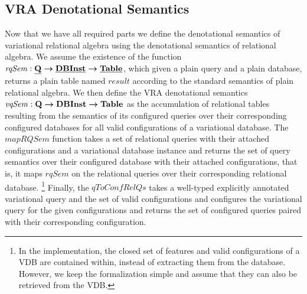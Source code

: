 \subsection{VRA Denotational Semantics }
\label{sec:vradensem}


Now that we have all required parts we define the denotational semantics of 
variational relational algebra using the denotational semantics of relational 
algebra. 
We assume the existence of the function
$\mathit{rqSem} : \pQSet \totype \pInstSet \totype \pTabSet$, which given a plain query and
a plain database, returns a plain table named $\mathit{result}$
according to the standard semantics of plain relational algebra.
%
We then define the VRA denotational semantics 
$\mathit{vqSem} : \qSet \totype \vdbInstSet \totype \tabletype$ as the 
accumulation of relational tables resulting from the semantics of its
configured queries over their corresponding configured databases for all 
valid configurations of a variational database. 
%
The $\mathit{mapRQSem}$ function takes a set of relational queries with their attached
configurations and a variational database instance and returns the set of query 
semantics over their configured database
with their attached configurations, that is, it maps $\mathit{rqSem}$ on the 
relational queries over their corresponding relational database.%
\footnote{In the implementation, the closed set of features and valid configurations
of a VDB are contained within, instead of extracting them from the database. However,
we keep the formalization simple and assume that they can also be retrieved from
the VDB.}
%
Finally, the $\mathit{qToConfRelQs}$ takes a well-typed explicitly annotated 
variational query and the set of valid configurations and configures the variational
query for the given configurations and returns the set of configured queries paired 
with their corresponding configuration.






